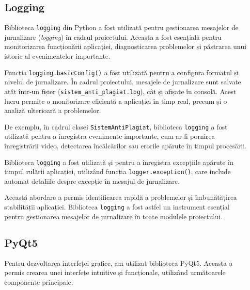 \documentclass[12pt,a4paper]{article}
\begin{document}
\subsection{Logging}
Biblioteca \texttt{logging}\cite{pythonlogging} din Python a fost utilizată pentru gestionarea mesajelor de jurnalizare (\textit{logging}) în cadrul proiectului. Aceasta a fost esențială pentru monitorizarea funcționării aplicației, diagnosticarea problemelor și păstrarea unui istoric al evenimentelor importante.

Funcția \texttt{logging.basicConfig()} a fost utilizată pentru a configura formatul și nivelul de jurnalizare. În cadrul proiectului, mesajele de jurnalizare sunt salvate atât într-un fișier (\texttt{sistem\_anti\_plagiat.log}), cât și afișate în consolă. Acest lucru permite o monitorizare eficientă a aplicației în timp real, precum și o analiză ulterioară a problemelor.

De exemplu, în cadrul clasei \texttt{SistemAntiPlagiat}, biblioteca \texttt{logging} a fost utilizată pentru a înregistra evenimente importante, cum ar fi pornirea înregistrării video, detectarea încălcărilor sau erorile apărute în timpul procesării.

Biblioteca \texttt{logging} a fost utilizată și pentru a înregistra excepțiile apărute în timpul rulării aplicației, utilizând funcția \texttt{logger.exception()}, care include automat detaliile despre excepție în mesajul de jurnalizare.

Această abordare a permis identificarea rapidă a problemelor și îmbunătățirea stabilității aplicației. Biblioteca \texttt{logging} a fost astfel un instrument esențial pentru gestionarea mesajelor de jurnalizare în toate modulele proiectului.

\subsection{PyQt5}
Pentru dezvoltarea interfeței grafice, am utilizat biblioteca PyQt5\cite{pyqt5}. Aceasta a permis crearea unei interfețe intuitive și funcționale, utilizând următoarele componente principale:
\end{document}
